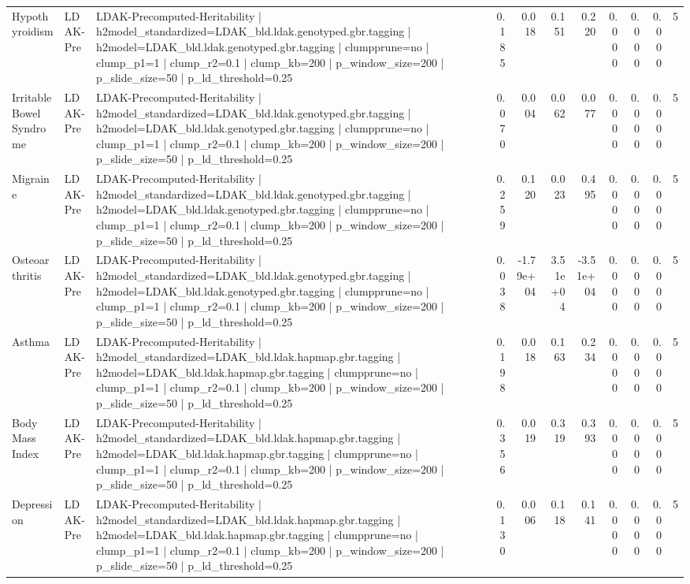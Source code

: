 \begin{landscape}
\begin{longtable}{p{2.4cm}p{1.8cm}p{6.0cm}rrrrrrrr}
Hypothyroidism & LDAK-Pre & LDAK-Precomputed-Heritability | h2model\_standardized=LDAK\_bld.ldak.genotyped.gbr.tagging | h2model=LDAK\_bld.ldak.genotyped.gbr.tagging | clumpprune=no | clump\_p1=1 | clump\_r2=0.1 | clump\_kb=200 | p\_window\_size=200 | p\_slide\_size=50 | p\_ld\_threshold=0.25 & 0.185 & 0.018 & 0.151 & 0.220 & 0.000 & 0.000 & 0.000 & 5 \\
Irritable Bowel Syndrome & LDAK-Pre & LDAK-Precomputed-Heritability | h2model\_standardized=LDAK\_bld.ldak.genotyped.gbr.tagging | h2model=LDAK\_bld.ldak.genotyped.gbr.tagging | clumpprune=no | clump\_p1=1 | clump\_r2=0.1 | clump\_kb=200 | p\_window\_size=200 | p\_slide\_size=50 | p\_ld\_threshold=0.25 & 0.070 & 0.004 & 0.062 & 0.077 & 0.000 & 0.000 & 0.000 & 5 \\
Migraine & LDAK-Pre & LDAK-Precomputed-Heritability | h2model\_standardized=LDAK\_bld.ldak.genotyped.gbr.tagging | h2model=LDAK\_bld.ldak.genotyped.gbr.tagging | clumpprune=no | clump\_p1=1 | clump\_r2=0.1 | clump\_kb=200 | p\_window\_size=200 | p\_slide\_size=50 | p\_ld\_threshold=0.25 & 0.259 & 0.120 & 0.023 & 0.495 & 0.000 & 0.000 & 0.000 & 5 \\
Osteoarthritis & LDAK-Pre & LDAK-Precomputed-Heritability | h2model\_standardized=LDAK\_bld.ldak.genotyped.gbr.tagging | h2model=LDAK\_bld.ldak.genotyped.gbr.tagging | clumpprune=no | clump\_p1=1 | clump\_r2=0.1 | clump\_kb=200 | p\_window\_size=200 | p\_slide\_size=50 | p\_ld\_threshold=0.25 & 0.038 & -1.79e+04 & 3.51e+04 & -3.51e+04 & 0.000 & 0.000 & 0.000 & 5 \\
Asthma & LDAK-Pre & LDAK-Precomputed-Heritability | h2model\_standardized=LDAK\_bld.ldak.hapmap.gbr.tagging | h2model=LDAK\_bld.ldak.hapmap.gbr.tagging | clumpprune=no | clump\_p1=1 | clump\_r2=0.1 | clump\_kb=200 | p\_window\_size=200 | p\_slide\_size=50 | p\_ld\_threshold=0.25 & 0.198 & 0.018 & 0.163 & 0.234 & 0.000 & 0.000 & 0.000 & 5 \\
Body Mass Index & LDAK-Pre & LDAK-Precomputed-Heritability | h2model\_standardized=LDAK\_bld.ldak.hapmap.gbr.tagging | h2model=LDAK\_bld.ldak.hapmap.gbr.tagging | clumpprune=no | clump\_p1=1 | clump\_r2=0.1 | clump\_kb=200 | p\_window\_size=200 | p\_slide\_size=50 | p\_ld\_threshold=0.25 & 0.356 & 0.019 & 0.319 & 0.393 & 0.000 & 0.000 & 0.000 & 5 \\
Depression & LDAK-Pre & LDAK-Precomputed-Heritability | h2model\_standardized=LDAK\_bld.ldak.hapmap.gbr.tagging | h2model=LDAK\_bld.ldak.hapmap.gbr.tagging | clumpprune=no | clump\_p1=1 | clump\_r2=0.1 | clump\_kb=200 | p\_window\_size=200 | p\_slide\_size=50 | p\_ld\_threshold=0.25 & 0.130 & 0.006 & 0.118 & 0.141 & 0.000 & 0.000 & 0.000 & 5 \\

\end{longtable}
\end{landscape}
